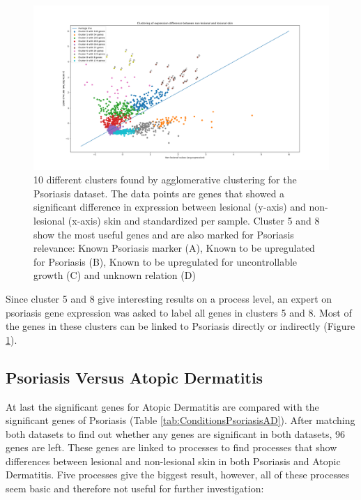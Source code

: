 \documentclass[10pt,a4paper]{article}
\begin{document}
	\begin{figure}[H]
		\includegraphics[width=\textwidth]{10_Clusters_Psoriasis_Results.png}
	
		\caption{10 different clusters found by agglomerative clustering for the Psoriasis dataset. The data points are genes that showed a significant difference in expression between lesional (y-axis) and non-lesional (x-axis) skin and standardized per sample. Cluster 5 and 8 show the most useful genes and are also marked for Psoriasis relevance: Known Psoriasis marker (A), Known to be upregulated for Psoriasis (B), Known to be upregulated for uncontrollable growth (C) and unknown relation (D)}
		\label{fig:ClusteredGenes}
	\end{figure}
	
	Since cluster 5 and 8 give interesting results on a process level, an expert on psoriasis gene expression was asked to label all genes in clusters 5 and 8. Most of the genes in these clusters can be linked to Psoriasis directly or indirectly (Figure \ref{fig:ClusteredGenes}).
	
	\subsection{Psoriasis Versus Atopic Dermatitis}
	\label{subsec:ResultsPsoriasisVersusAtopicDermatitis}
	
	At last the significant genes for Atopic Dermatitis are compared with the significant genes of Psoriasis (Table \ref{tab:ConditionsPsoriasisAD}). After matching both datasets to find out whether any genes are significant in both datasets, 96 genes are left. These genes are linked to processes to find processes that show differences between lesional and non-lesional skin in both Psoriasis and Atopic Dermatitis. Five processes give the biggest result, however, all of these processes seem basic and therefore not useful for further investigation:
	
\end{document}
